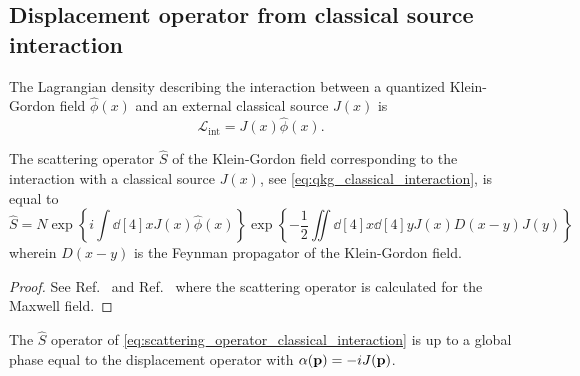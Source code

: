 \subsection{Displacement operator from classical source interaction}

\begin{definition}
	The Lagrangian density describing the interaction between a quantized Klein-Gordon field $\hat\phi(x)$ and an external classical source $J(x)$ is
	\begin{equation}
		\mathcal{L}_\text{int}
		=
		J(x)
		\hat\phi(x)
		\label{eq:qkg_classical_interaction}
		.
	\end{equation}
\end{definition}
\begin{theorem}
	The scattering operator $\hat{S}$ of the Klein-Gordon field corresponding to the interaction with a classical source $J(x)$, see \cref{eq:qkg_classical_interaction}, is equal to
	\begin{equation}
		\hat{S}
		=
		N\exp\left\{
			i\int\dd[4]{x}
			J(x)
			\hat\phi(x)
		\right\}
		\exp\left\{
			-
			\frac{1}{2}
			\iint\dd[4]{x}\dd[4]{y}
			J(x)
			D(x-y)
			J(y)
		\right\}
		\label{eq:scattering_operator_classical_interaction}
	\end{equation}
	wherein $D(x-y)$ is the Feynman propagator of the Klein-Gordon field.
\end{theorem}
\begin{proof}
	See Ref.~\cite{Zhang1999} and Ref.~\cite[p.~180]{Itzykson2012} where the scattering operator is calculated for the Maxwell field.
\end{proof}
\begin{theorem}
	The $\hat{S}$ operator of \cref{eq:scattering_operator_classical_interaction} is up to a global phase equal to the displacement operator with $\alpha(\vb{p})=-iJ(\vb{p})$.
\end{theorem}
